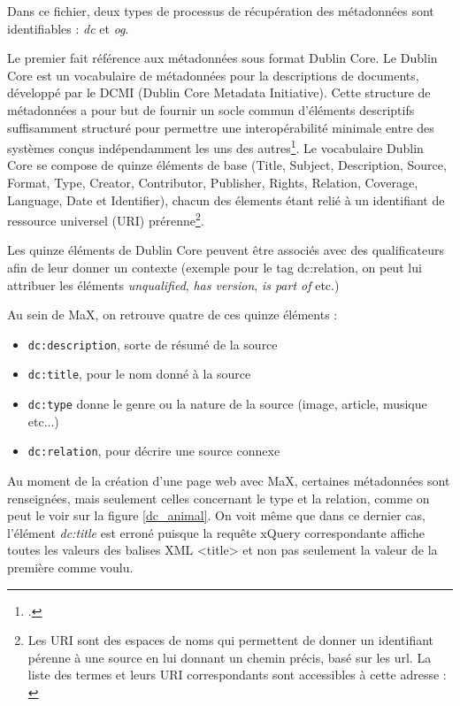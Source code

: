 \documentclass[a4paper,12pt,twoside]{book}
\begin{document}
Dans ce fichier, deux types de processus de récupération des métadonnées sont identifiables : \textit{dc}  et \textit{og}.

Le premier fait référence aux métadonnées sous format Dublin Core. Le Dublin Core est un vocabulaire de métadonnées pour la  descriptions de documents, développé par le DCMI (Dublin Core Metadata Initiative). Cette structure de métadonnées a pour but de \og fournir un socle commun d'éléments descriptifs suffisamment structuré pour permettre une interopérabilité minimale entre des systèmes conçus indépendamment les uns des autres\footcite{dublincore}\fg. Le vocabulaire Dublin Core se compose de quinze éléments de base (Title, Subject, Description, Source, Format, Type, Creator, Contributor, Publisher, Rights, Relation, Coverage, Language, Date et Identifier), chacun des élements étant relié à un identifiant de ressource universel (URI) prérenne\footnote{Les URI sont des espaces de noms qui permettent de donner un identifiant pérenne à une source en lui donnant un chemin précis, basé sur les url. La liste des termes et leurs URI correspondants sont accessibles à cette adresse : \cite{dcmi}}.


Les quinze éléments de Dublin Core peuvent être associés avec des qualificateurs afin de leur donner un contexte (exemple pour le tag dc:relation, on peut lui attribuer les éléments \textit{unqualified}, \textit{has version}, \textit{is part of} etc.)


Au sein de MaX, on retrouve quatre de ces quinze éléments :

\begin{itemize}
    \item \texttt{dc:description}, sorte de résumé de la source
    \item \texttt{dc:title}, pour le nom donné à la source
    \item \texttt{dc:type} donne le genre ou la nature de la source (image, article, musique etc...)
    \item \texttt{dc:relation}, pour décrire une source connexe
\end{itemize}

Au moment de la création d'une page web avec MaX, certaines métadonnées sont renseignées, mais seulement celles concernant le type et la relation, comme on peut le voir sur la figure \ref{dc_animal}. On voit même que dans ce dernier cas, l'élément \textit{dc:title} est erroné puisque la requête xQuery correspondante affiche toutes les valeurs des balises XML <title> et non pas seulement la valeur de la première comme voulu.
\end{document}
